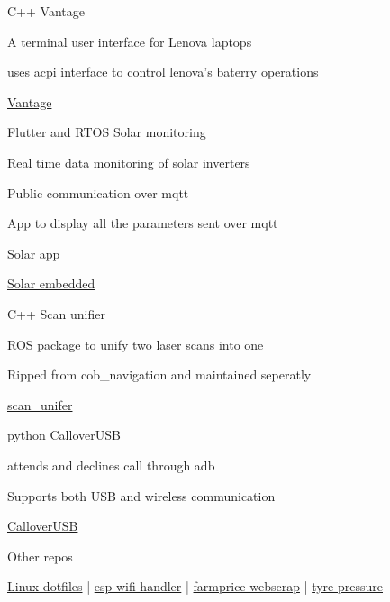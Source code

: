 \begin{cventries}
	\cventry
	{C++} %
	{Vantage} %
	{} %
	{} %
	{
		\begin{cvitems} %
			\item {A terminal user interface for Lenova laptops}
			\item {uses acpi interface to control lenova's baterry operations}
			\item {\href{https://github.com/gokulmaxi/vantage} { \faGithub \space Vantage}}
		\end{cvitems}
	}

	\cventry
	{Flutter and RTOS} %
	{Solar monitoring} %
	{} %
	{} %
	{
		\begin{cvitems} %
			\item {Real time data monitoring of solar inverters}
			\item {Public communication over mqtt }
			\item {App to display all the parameters sent over mqtt}
			\item {\href{https://github.com/gokulmaxi/solar-intern_app}{\faGithub \space Solar app}}
			\item {\href{https://github.com/gokulmaxi/solar_embedded}{\faGithub\space Solar embedded}}
		\end{cvitems}
	}
	\cventry
	{C++} %
	{Scan unifier} %
	{} %
	{} %
	{
		\begin{cvitems} %
			\item {ROS package to unify two laser scans into one}
			\item {Ripped from cob\_navigation and maintained seperatly}
			\item {\href{https://github.com/gokulmaxi/scan_unifier}{\faGithub \space scan\_unifer}}
		\end{cvitems}
	}
	\cventry
	{python}%
	{CalloverUSB} %
	{} %
	{} %
	{
		\begin{cvitems} %
			\item {attends and declines call through adb}
			\item {Supports both USB and wireless communication}
			\item {\href{https://github.com/gokulmaxi/pythoncalloverusb}{\faGithub \space CalloverUSB}}
		\end{cvitems}
	}
	\cventry
	{}%
	{Other repos} %
	{} %
	{} %
	{
		\begin{cvitems} %
			\item {\href{https://github.com/gokulmaxi/dotfiles}{\faGithub \space Linux dotfiles} | \href{https://github.com/gokulmaxi/espwifi_handler}{\faGithub \space esp wifi handler} | \href{https://github.com/gokulmaxi/farmprice-webscrap}{\faGithub \space farmprice-webscrap} | \href{https://github.com/gokulmaxi/BMP180_MC60}{\faGithub \space tyre pressure}}
		\end{cvitems}
	}

\end{cventries}

